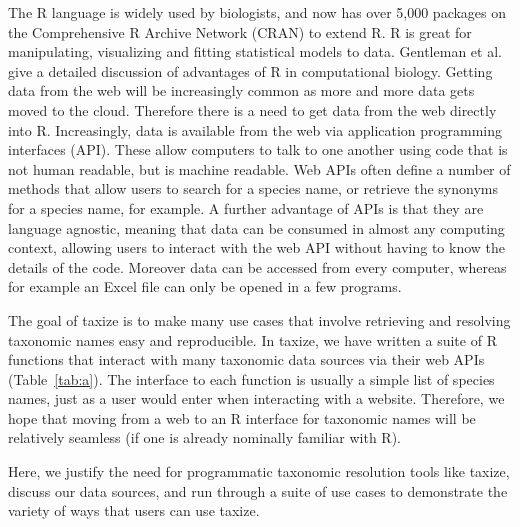 \documentclass[10pt,a4paper,twocolumn]{article}\usepackage[]{graphicx}\usepackage[]{color}
\begin{document}
The R language is widely used by biologists, and now has over 5,000 packages on the Comprehensive R Archive Network (CRAN) to extend R. R is great for manipulating, visualizing and fitting statistical models to data. Gentleman et al. \cite{gentleman_bioconductor:_2004} give a detailed discussion of advantages of R in computational biology. Getting data from the web will be increasingly common as more and more data gets moved to the cloud. Therefore there is a need to get data from the web directly into R. Increasingly, data is available from the web via application programming interfaces (API). These allow computers to talk to one another using code that is not human readable, but is machine readable. Web APIs often define a number of methods that allow users to search for a species name, or retrieve the synonyms for a species name, for example. A further advantage of APIs is that they are language agnostic, meaning that data can be consumed in almost any computing context, allowing users to interact with the web API without having to know the details of the code. Moreover data can be accessed from every computer, whereas for example an Excel file can only be opened in a few programs. 

The goal of taxize is to make many use cases that involve retrieving and resolving taxonomic names easy and reproducible. In taxize, we have written a suite of R functions that interact with many taxonomic data sources via their web APIs (Table~\ref{tab:a}). The interface to each function is usually a simple list of species names, just as a user would enter when interacting with a website. Therefore, we hope that moving from a web to an R interface for taxonomic names will be relatively seamless (if one is already nominally familiar with R). 

Here, we justify the need for programmatic taxonomic resolution tools like taxize, discuss our data sources, and run through a suite of use cases to demonstrate the variety of ways that users can use taxize.
\end{document}
